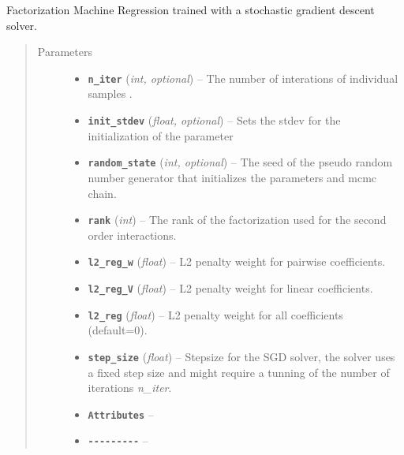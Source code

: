 \documentclass[letterpaper,10pt,english]{sphinxmanual}
\begin{document}
\begin{fulllineitems}
\label{api:fastFM.sgd.FMRegression}
Factorization Machine Regression trained with a stochastic gradient
descent solver.
\begin{quote}\begin{description}
\item[{Parameters}] \leavevmode\begin{itemize}
\item {} 
\textbf{\texttt{n\_iter}} (\emph{int, optional}) -- The number of interations of individual samples .

\item {} 
\textbf{\texttt{init\_stdev}} (\emph{float, optional}) -- Sets the stdev for the initialization of the parameter

\item {} 
\textbf{\texttt{random\_state}} (\emph{int, optional}) -- The seed of the pseudo random number generator that
initializes the parameters and mcmc chain.

\item {} 
\textbf{\texttt{rank}} (\emph{int}) -- The rank of the factorization used for the second order interactions.

\item {} 
\textbf{\texttt{l2\_reg\_w}} (\emph{float}) -- L2 penalty weight for pairwise coefficients.

\item {} 
\textbf{\texttt{l2\_reg\_V}} (\emph{float}) -- L2 penalty weight for linear coefficients.

\item {} 
\textbf{\texttt{l2\_reg}} (\emph{float}) -- L2 penalty weight for all coefficients (default=0).

\item {} 
\textbf{\texttt{step\_size}} (\emph{float}) -- Stepsize for the SGD solver, the solver uses a fixed step size and
might require a tunning of the number of iterations \emph{n\_iter}.

\item {} 
\textbf{\texttt{Attributes}} -- 

\item {} 
\textbf{\texttt{-{-}-{-}-{-}-{-}-}} -- 


\end{itemize}
\end{description}
\end{quote}
\end{fulllineitems}
\end{document}
